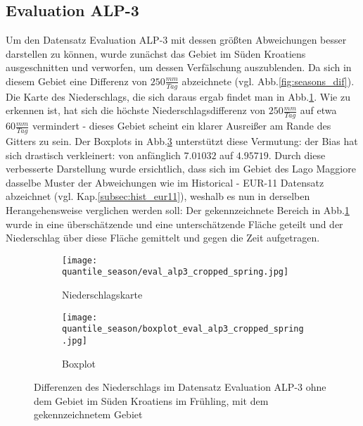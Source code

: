 \subsection{Evaluation ALP-3}\label{subsec:eval_alp3}
Um den Datensatz Evaluation ALP-3 mit dessen größten Abweichungen besser darstellen zu können, wurde zunächst das Gebiet im Süden Kroatiens ausgeschnitten und verworfen, um dessen Verfälschung auszublenden. Da sich in diesem Gebiet eine Differenz von $250\frac{mm}{Tag}$ abzeichnete (vgl. Abb.\ref{fig:seasons_dif}). Die Karte des Niederschlags, die sich daraus ergab findet man in Abb.\ref{fig:seasons:cropped eval_alp_3}. Wie zu erkennen ist, hat sich die höchste Niederschlagsdifferenz von $250\frac{mm}{Tag}$ auf etwa $60\frac{mm}{Tag}$ vermindert - dieses Gebiet scheint ein klarer Ausreißer am Rande des Gitters zu sein. Der Boxplots in Abb.\ref{fig:seasons:cropped eval_alp_3_boxplot} unterstützt diese Vermutung: der Bias hat sich drastisch verkleinert: von anfänglich $7.01032$ auf $4.95719$. Durch diese verbesserte Darstellung wurde ersichtlich, dass sich im Gebiet des Lago Maggiore dasselbe Muster der Abweichungen wie im Historical - EUR-11 Datensatz abzeichnet (vgl. Kap.\ref{subsec:hist_eur11}), weshalb es nun in derselben Herangehensweise verglichen werden soll: Der gekennzeichnete Bereich in Abb.\ref{fig:seasons:cropped eval_alp_3} wurde in eine überschätzende und eine unterschätzende Fläche geteilt und der Niederschlag über diese Fläche gemittelt und gegen die Zeit aufgetragen.\\

\begin{figure}[h]
	\begin{subfigure}{0.49\textwidth}
		\texttt{[image: quantile\_season/eval\_alp3\_cropped\_spring.jpg]}
		\caption{Niederschlagskarte}
		\label{fig:seasons:cropped eval_alp_3}
	\end{subfigure}
	\begin{subfigure}{0.49\textwidth}
		\texttt{[image: quantile\_season/boxplot\_eval\_alp3\_cropped\_spring.jpg]}
		\caption{Boxplot}
		\label{fig:seasons:cropped eval_alp_3_boxplot}
	\end{subfigure}
	\caption{Differenzen des Niederschlags im Datensatz Evaluation ALP-3 ohne dem Gebiet im Süden Kroatiens im Frühling, mit dem gekennzeichnetem Gebiet}
\end{figure}

